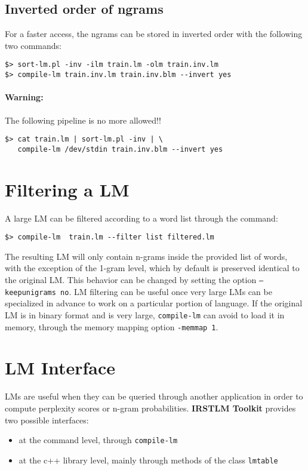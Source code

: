 \documentclass[11pt]{article}
\newcommand{\IRSTLM}{{\bf IRSTLM Toolkit}}
\newcommand{\COMMENT}[1]{}
\begin{document}
\subsection{Inverted order of ngrams}
\label{sec:inverted-lm}
For a faster access, the ngrams can be stored in inverted order with the following two commands:
\begin{verbatim}
$> sort-lm.pl -inv -ilm train.lm -olm train.inv.lm
$> compile-lm train.inv.lm train.inv.blm --invert yes
\end{verbatim}

\paragraph{Warning:} The following pipeline is no more allowed!!

\COMMENT{
or with the following pipeline:
}
\begin{verbatim}
$> cat train.lm | sort-lm.pl -inv | \
   compile-lm /dev/stdin train.inv.blm --invert yes
\end{verbatim}

\newpage
\section{Filtering a LM}
A large LM can be filtered according to a word list through the command:

\begin{verbatim}
$> compile-lm  train.lm --filter list filtered.lm
\end{verbatim}
The resulting LM will only contain n-grams inside the provided list of words,
with the exception of the 1-gram level, which by default is preserved identical
to the original LM. This behavior can be changed by setting the option 
{\tt --keepunigrams no}.  LM filtering can be useful once very large LMs can
be specialized in advance to work on a particular portion of language.
\noindent
If the original LM is in binary format and is very large, {\tt compile-lm} can avoid to load it in memory,
through the memory mapping option {\tt -memmap 1}.







\newpage
\section{LM Interface}
LMs are useful when they can be queried through another application in order to compute 
perplexity scores or n-gram probabilities. {\IRSTLM} provides two possible interfaces: 
\begin{itemize}
\item at the command level, through  {\tt compile-lm}
\item at the c++ library level, mainly through methods of the class {\tt lmtable}
\end{itemize}
\end{document}
